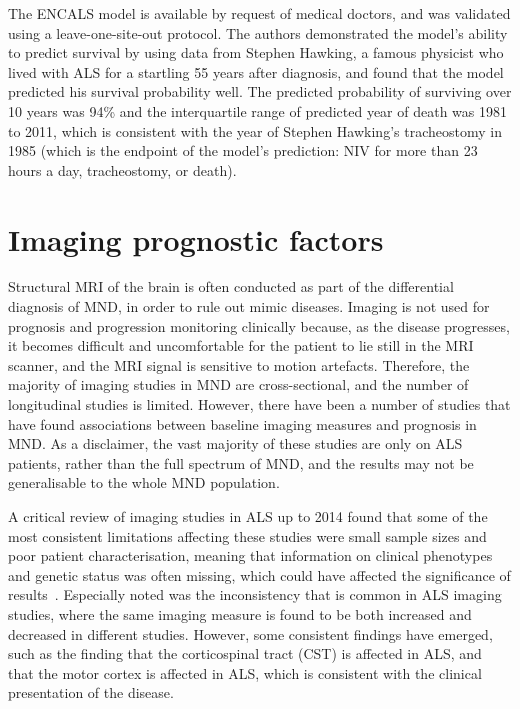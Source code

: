 The ENCALS model is available by request of medical doctors, and was validated using a leave-one-site-out protocol.
The authors demonstrated the model's ability to predict survival by using data from Stephen Hawking, a famous physicist who lived with ALS for a startling 55 years after diagnosis, and found that the model predicted his survival probability well.
The predicted probability of surviving over 10 years was 94\% and the interquartile range of predicted year of death was 1981 to 2011, which is consistent with the year of Stephen Hawking's tracheostomy in 1985 (which is the endpoint of the model's prediction: NIV for more than 23 hours a day, tracheostomy, or death).




\section{Imaging prognostic factors}

Structural MRI of the brain is often conducted as part of the differential diagnosis of MND, in order to rule out mimic diseases.
Imaging is not used for prognosis and progression monitoring clinically because, as the disease progresses, it becomes difficult and uncomfortable for the patient to lie still in the MRI scanner, and the MRI signal is sensitive to motion artefacts.
Therefore, the majority of imaging studies in MND are cross-sectional, and the number of longitudinal studies is limited.
However, there have been a number of studies that have found associations between baseline imaging measures and prognosis in MND.
As a disclaimer, the vast majority of these studies are only on ALS patients, rather than the full spectrum of MND, and the results may not be generalisable to the whole MND population.

A critical review of imaging studies in ALS up to 2014 found that some of the most consistent limitations affecting these studies were small sample sizes and poor patient characterisation, meaning that information on clinical phenotypes and genetic status was often missing, which could have affected the significance of results~\cite{bedeLessonsALSImaging2014}.
Especially noted was the inconsistency that is common in ALS imaging studies, where the same imaging measure is found to be both increased and decreased in different studies.
However, some consistent findings have emerged, such as the finding that the corticospinal tract (CST) is affected in ALS, and that the motor cortex is affected in ALS, which is consistent with the clinical presentation of the disease.

